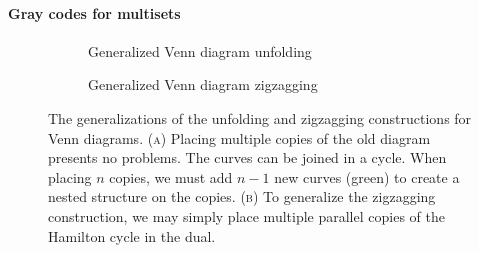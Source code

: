 \documentclass[fontsize=11pt,a4paper,DIV=12]{scrartcl}
\begin{document}
\paragraph{Gray codes for multisets}
\begin{figure}[htbp]
    \centering
    \begin{subfigure}[b]{0.48\textwidth}
        \centering
        
        \caption{Generalized Venn diagram unfolding}
        \label{fig:venn unfolding generalized}
    \end{subfigure}
    \hfill
    \begin{subfigure}[b]{0.48\textwidth}
        \centering
        
        \caption{Generalized Venn diagram zigzagging}
        \label{fig:venn zigzagging generalized}
    \end{subfigure}
    
    \caption{The generalizations of the unfolding and zigzagging constructions for Venn diagrams. (\textsc{a}) Placing multiple copies of the old diagram presents no problems. The curves can be joined in a cycle. When placing $n$ copies, we must add $n-1$ new curves (green) to create a nested structure on the copies. (\textsc{b}) To generalize the zigzagging construction, we may simply place multiple parallel copies of the Hamilton cycle in the dual.}
    \label{fig:combined venn generalized}
\end{figure}
\end{document}
